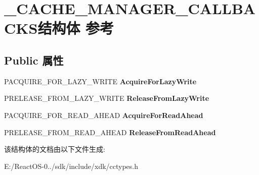 \hypertarget{struct___c_a_c_h_e___m_a_n_a_g_e_r___c_a_l_l_b_a_c_k_s}{}\section{\+\_\+\+C\+A\+C\+H\+E\+\_\+\+M\+A\+N\+A\+G\+E\+R\+\_\+\+C\+A\+L\+L\+B\+A\+C\+K\+S结构体 参考}
\label{struct___c_a_c_h_e___m_a_n_a_g_e_r___c_a_l_l_b_a_c_k_s}
\subsection*{Public 属性}
\begin{DoxyCompactItemize}
\item 
\mbox{\label{struct___c_a_c_h_e___m_a_n_a_g_e_r___c_a_l_l_b_a_c_k_s_a4ffcbdb1b43e513c923e17e3aced250a}} 
P\+A\+C\+Q\+U\+I\+R\+E\+\_\+\+F\+O\+R\+\_\+\+L\+A\+Z\+Y\+\_\+\+W\+R\+I\+TE {\bfseries Acquire\+For\+Lazy\+Write}
\item 
\mbox{\label{struct___c_a_c_h_e___m_a_n_a_g_e_r___c_a_l_l_b_a_c_k_s_a6a3b893a39bb7a7ac2fdc175576cc5e6}} 
P\+R\+E\+L\+E\+A\+S\+E\+\_\+\+F\+R\+O\+M\+\_\+\+L\+A\+Z\+Y\+\_\+\+W\+R\+I\+TE {\bfseries Release\+From\+Lazy\+Write}
\item 
\mbox{\label{struct___c_a_c_h_e___m_a_n_a_g_e_r___c_a_l_l_b_a_c_k_s_a738a11b72160f5d2292f80d6228081f7}} 
P\+A\+C\+Q\+U\+I\+R\+E\+\_\+\+F\+O\+R\+\_\+\+R\+E\+A\+D\+\_\+\+A\+H\+E\+AD {\bfseries Acquire\+For\+Read\+Ahead}
\item 
\mbox{\label{struct___c_a_c_h_e___m_a_n_a_g_e_r___c_a_l_l_b_a_c_k_s_ad37e821c24814e40c76ff0e2bbe331cd}} 
P\+R\+E\+L\+E\+A\+S\+E\+\_\+\+F\+R\+O\+M\+\_\+\+R\+E\+A\+D\+\_\+\+A\+H\+E\+AD {\bfseries Release\+From\+Read\+Ahead}
\end{DoxyCompactItemize}


该结构体的文档由以下文件生成\+:\begin{DoxyCompactItemize}
\item 
E\+:/\+React\+O\+S-\/0../sdk/include/xdk/cctypes.\+h\end{DoxyCompactItemize}
